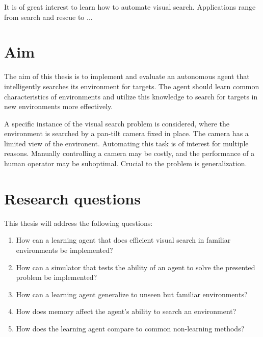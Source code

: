 It is of great interest to learn how to automate visual search. Applications range from search and rescue to ...


\section{Aim}
\label{sec:aim}

The aim of this thesis is to implement and evaluate an autonomous agent that intelligently searches its environment for targets. The agent should learn common characteristics of environments and utilize this knowledge to search for targets in new environments more effectively.

A specific instance of the visual search problem is considered, where the environment is searched by a pan-tilt camera fixed in place. The camera has a limited view of the environent. Automating this task is of interest for multiple reasons. Manually controlling a camera may be costly, and the performance of a human operator may be suboptimal. Crucial to the problem is generalization.

\section{Research questions}
\label{sec:research-questions}

This thesis will address the following questions:

\begin{enumerate}
  \item How can a learning agent that does efficient visual search in familiar environments be implemented?
  \item How can a simulator that tests the ability of an agent to solve the presented problem be implemented?
  \item How can a learning agent generalize to unseen but familiar environments?
  \item How does memory affect the agent's ability to search an environment?
  \item How does the learning agent compare to common non-learning methods?
\end{enumerate}


